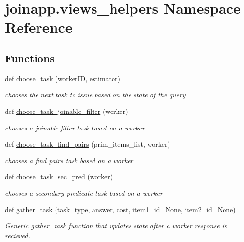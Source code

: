 \hypertarget{namespacejoinapp_1_1views__helpers}{}\section{joinapp.\+views\+\_\+helpers Namespace Reference}
\label{namespacejoinapp_1_1views__helpers}
\subsection*{Functions}
\begin{DoxyCompactItemize}
\item 
def \mbox{\hyperlink{namespacejoinapp_1_1views__helpers_a83cad79c1fca193b0ff978b9fddf0bfb}{choose\+\_\+task}} (worker\+ID, estimator)
\begin{DoxyCompactList}\small\item\em chooses the next task to issue based on the state of the query \end{DoxyCompactList}\item 
def \mbox{\hyperlink{namespacejoinapp_1_1views__helpers_a6520bad88409993e2fd43bc18136589a}{choose\+\_\+task\+\_\+joinable\+\_\+filter}} (worker)
\begin{DoxyCompactList}\small\item\em chooses a joinable filter task based on a worker \end{DoxyCompactList}\item 
def \mbox{\hyperlink{namespacejoinapp_1_1views__helpers_add72af02158504b79ecb6a29f5dfdb4e}{choose\+\_\+task\+\_\+find\+\_\+pairs}} (prim\+\_\+items\+\_\+list, worker)
\begin{DoxyCompactList}\small\item\em chooses a find pairs task based on a worker \end{DoxyCompactList}\item 
def \mbox{\hyperlink{namespacejoinapp_1_1views__helpers_a1dbf2ade9c80cee800fe671327226ba4}{choose\+\_\+task\+\_\+sec\+\_\+pred}} (worker)
\begin{DoxyCompactList}\small\item\em chooses a secondary predicate task based on a worker \end{DoxyCompactList}\item 
def \mbox{\hyperlink{namespacejoinapp_1_1views__helpers_af657777675d99bfe303a5ce3c1409144}{gather\+\_\+task}} (task\+\_\+type, answer, cost, item1\+\_\+id=None, item2\+\_\+id=None)
\begin{DoxyCompactList}\small\item\em Generic gather\+\_\+task function that updates state after a worker response is recieved. \end{DoxyCompactList}\item 

\end{DoxyCompactItemize}
